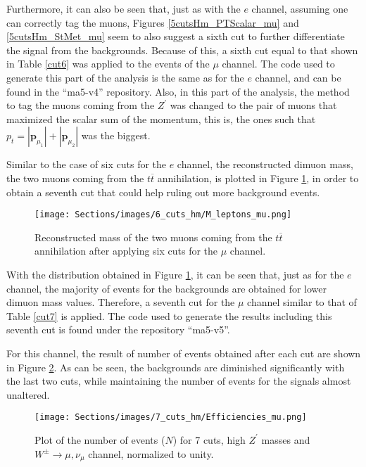 Furthermore, it can also be seen that, just as with the $e$ channel, assuming one can correctly tag the muons, Figures \ref{5cutsHm_PTScalar_mu} and \ref{5cutsHm_StMet_mu} seem to also suggest a sixth cut to further differentiate the signal from the backgrounds. Because of this, a sixth cut equal to that shown in Table \ref{cut6} was applied to the events of the $\mu$ channel. The code used to generate this part of the analysis is the same as for the $e$ channel, and can be found in the ``ma5-v4'' repository. Also, in this part of the analysis, the method to tag the muons coming from the $Z^{\prime}$ was changed to the pair of muons that maximized the scalar sum of the momentum, this is, the ones such that $p_t = |\bm{p}_{\mu_1}| + |\bm{p}_{\mu_2}|$ was the biggest.

Similar to the case of six cuts for the $e$ channel, the reconstructed dimuon mass, the two muons coming from the $t\overline t$ annihilation, is plotted in Figure \ref{6cutsHm_Mleptons_mu}, in order to obtain a seventh cut that could help ruling out more background events.

\begin{figure}[ht]
    \centering
    \texttt{[image: Sections/images/6\_cuts\_hm/M\_leptons\_mu.png]}
    \caption{Reconstructed mass of the two muons coming from the $t\overline t$ annihilation after applying six cuts for the $\mu$ channel.}
    \label{6cutsHm_Mleptons_mu}
\end{figure}

With the distribution obtained in Figure \ref{6cutsHm_Mleptons_mu}, it can be seen that, just as for the $e$ channel, the majority of events for the backgrounds are obtained for lower dimuon mass values. Therefore, a seventh cut for the $\mu$ channel similar to that of Table \ref{cut7} is applied. The code used to generate the results including this seventh cut is found under the repository ``ma5-v5''.

\vspace{0.6cm}

For this channel, the result of number of events obtained after each cut are shown in Figure \ref{7cutsHm_Eff_mu}. As can be seen, the backgrounds are diminished significantly with the last two cuts, while maintaining the number of events for the signals almost unaltered.

\begin{figure}[ht!]
    \centering
    \texttt{[image: Sections/images/7\_cuts\_hm/Efficiencies\_mu.png]}
    \caption{Plot of the number of events ($N$) for 7 cuts, high $Z^{\prime}$ masses and $W^{\pm}\rightarrow \mu, \nu_{\mu}$ channel, normalized to unity.}
    \label{7cutsHm_Eff_mu}
\end{figure}

